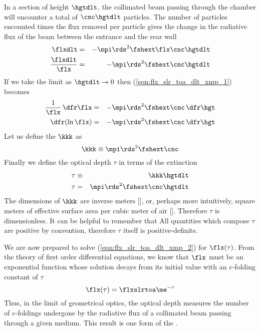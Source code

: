 \documentclass[12pt]{article}
\begin{document}
In a section of height $\hgtdlt$, the collimated beam passing
through the chamber will encounter a total of $\cnc \hgtdlt$
particles. 
The number of particles encounted times the flux removed per particle
gives the change in the radiative flux of the beam between the
entrance and the rear wall
\begin{eqnarray}
\flxdlt & = & - \mpi \rds^{2} \fshext \flx \cnc \hgtdlt \nonumber \\
\frac{\flxdlt}{\flx} & = & - \mpi \rds^{2} \fshext \cnc \hgtdlt
\label{eqn:flx_slr_toa_dlt_xmp_1}
\end{eqnarray}
If we take the limit as $\hgtdlt \rightarrow 0$ then
(\ref{eqn:flx_slr_toa_dlt_xmp_1}) becomes 
\begin{eqnarray}
\frac{1}{\flx} \,\dfr\flx & = & -  \mpi \rds^{2} \fshext \cnc \,\dfr\hgt
\nonumber \\
{\dfr(\ln \flx)} & = & - \mpi \rds^{2} \fshext \cnc \,\dfr\hgt
\label{eqn:flx_slr_toa_dlt_xmp_2}
\end{eqnarray}
Let us define the  $\kkk$ as
\begin{equation}
\kkk \equiv \mpi \rds^{2} \fshext \cnc
\label{eqn:ext_xmp_2}
\end{equation}
Finally we define the optical depth $\tau$ in terms of the extinction
\begin{eqnarray}
\tau & \equiv & \kkk \hgtdlt \\
\tau & = & \mpi \rds^{2} \fshext \cnc \hgtdlt
\label{eqn:tau_xmp_2}
\end{eqnarray}
The dimensions of $\kkk$ are inverse meters [\xm], or, perhaps more
intuitively, square meters of effective surface area per cubic meter
of air [\mSxmC].
Therefore $\tau$ is dimensionless. 
It can be helpful to remember that 
All quantities which compose $\tau$ are positive by convention,
therefore $\tau$ itself is positive-definite.

We are now prepared to solve (\ref{eqn:flx_slr_toa_dlt_xmp_2}) for
$\flx(\tau)$. 
From the theory of first order differential equations, we know that
$\flx$ must be an exponential function whose solution decays from its
initial value with an $e$-folding constant of $\tau$ 
\begin{equation}
\flx(\tau) = \flxslrtoa \me^{-\tau}
\label{eqn:flx_slr_toa_dlt_xmp_4}
\end{equation}
Thus, in the limit of geometrical optics, the optical depth measures
the number of $e$-foldings undergone by the radiative flux of a
collimated beam passing through a given medium.  
This result is one form of the .
\end{document}
